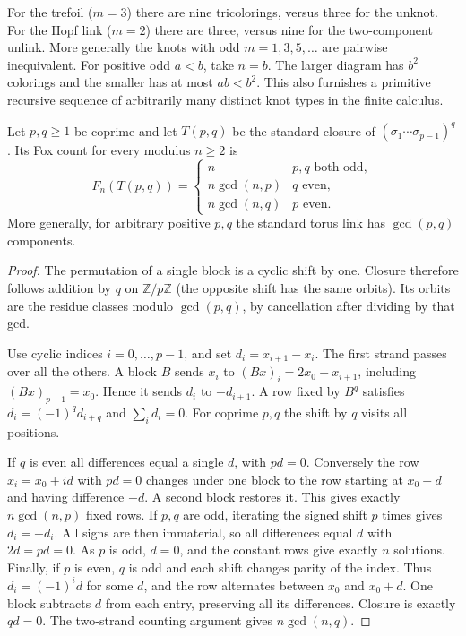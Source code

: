 For the trefoil ($m=3$) there are nine tricolorings, versus three for the
unknot. For the Hopf link ($m=2$) there are three, versus nine for the
two-component unlink. More generally the knots with odd $m=1,3,5,\ldots$
are pairwise inequivalent. For positive odd $a<b$, take $n=b$.
The larger diagram has $b^2$ colorings and the smaller has at most $ab<b^2$.
This also furnishes a primitive recursive sequence of arbitrarily many
distinct knot types in the finite calculus.

\begin{theorem}
Let $p,q\ge1$ be coprime and let $T(p,q)$ be the standard closure of
$(\sigma_1\cdots\sigma_{p-1})^q$. Its Fox count for every modulus $n\ge2$ is
\[
 F_n(T(p,q))=
 \begin{cases}
 n & p,q\text{ both odd},\\
 n\gcd(n,p)&q\text{ even},\\
 n\gcd(n,q)&p\text{ even}.
 \end{cases}
\]
More generally, for arbitrary positive $p,q$ the standard torus link has
$\gcd(p,q)$ components.
\end{theorem}
\begin{proof}
The permutation of a single block is a cyclic shift by one. Closure
therefore follows addition by $q$ on $\mathbb Z/p\mathbb Z$ (the opposite
shift has the same orbits). Its orbits are the residue classes modulo
$\gcd(p,q)$, by cancellation after dividing by that gcd.

Use cyclic indices $i=0,\ldots,p-1$, and set $d_i=x_{i+1}-x_i$. The
first strand passes over all the others. A block $B$ sends $x_i$ to
$(Bx)_i=2x_0-x_{i+1}$, including $(Bx)_{p-1}=x_0$. Hence it sends
$d_i$ to $-d_{i+1}$. A row fixed by $B^q$ satisfies
$d_i=(-1)^q d_{i+q}$ and $\sum_i d_i=0$. For coprime $p,q$ the shift by
$q$ visits all positions.

If $q$ is even all differences equal a single $d$, with $pd=0$.
Conversely the row $x_i=x_0+id$ with $pd=0$ changes under one block to
the row starting at $x_0-d$ and having difference $-d$. A second block
restores it. This gives exactly $n\gcd(n,p)$ fixed rows.
If $p,q$ are odd, iterating the signed shift $p$ times gives $d_i=-d_i$.
All signs are then immaterial, so all differences equal $d$ with
$2d=pd=0$. As $p$ is odd, $d=0$, and the constant rows give exactly $n$
solutions. Finally, if $p$ is even, $q$ is odd and each shift changes
parity of the index. Thus $d_i=(-1)^i d$ for some $d$, and the row
alternates between $x_0$ and $x_0+d$. One block subtracts $d$ from
each entry, preserving all its differences. Closure is exactly $qd=0$.
The two-strand counting argument gives $n\gcd(n,q)$.
\end{proof}


